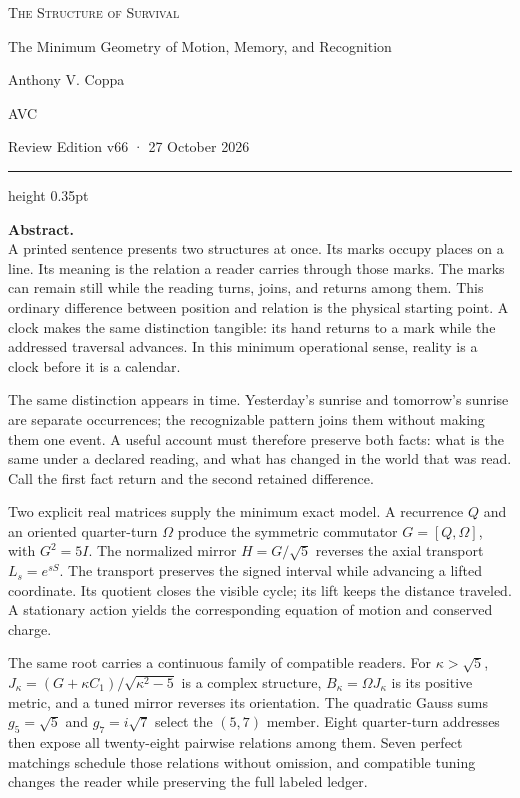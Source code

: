 \documentclass[10pt]{article}
\begin{document}
\begin{center}
{\LARGE\scshape The Structure of Survival\par}
\vspace{0.15em}
{\large The Minimum Geometry of Motion, Memory, and Recognition\par}
\vspace{0.8em}
{\normalsize Anthony V. Coppa\par}
{\small AVC\par}
\vspace{0.35em}
{\small Review Edition v66 · 27 October 2026\par}
\end{center}
\vspace{0.5em}
\hrule height 0.35pt
\vspace{0.75em}

\noindent\textbf{Abstract.}\\[-1.1em]

A printed sentence presents two structures at once. Its marks occupy places on a line. Its meaning is the relation a reader carries through those marks. The marks can remain still while the reading turns, joins, and returns among them. This ordinary difference between position and relation is the physical starting point. A clock makes the same distinction tangible: its hand returns to a mark while the addressed traversal advances. In this minimum operational sense, reality is a clock before it is a calendar.

The same distinction appears in time. Yesterday's sunrise and tomorrow's sunrise are separate occurrences; the recognizable pattern joins them without making them one event. A useful account must therefore preserve both facts: what is the same under a declared reading, and what has changed in the world that was read. Call the first fact return and the second retained difference.

Two explicit real matrices supply the minimum exact model. A recurrence $Q$ and an oriented quarter-turn $\Omega$ produce the symmetric commutator $G=[Q,\Omega]$, with $G^2=5I$. The normalized mirror $H=G/\sqrt5$ reverses the axial transport $L_s=e^{sS}$. The transport preserves the signed interval while advancing a lifted coordinate. Its quotient closes the visible cycle; its lift keeps the distance traveled. A stationary action yields the corresponding equation of motion and conserved charge.

The same root carries a continuous family of compatible readers. For $\kappa>\sqrt5$, $J_\kappa=(G+\kappa C_1)/\sqrt{\kappa^2-5}$ is a complex structure, $B_\kappa=\Omega J_\kappa$ is its positive metric, and a tuned mirror reverses its orientation. The quadratic Gauss sums $g_5=\sqrt5$ and $g_7=i\sqrt7$ select the $(5,7)$ member. Eight quarter-turn addresses then expose all twenty-eight pairwise relations among them. Seven perfect matchings schedule those relations without omission, and compatible tuning changes the reader while preserving the full labeled ledger.
\end{document}
